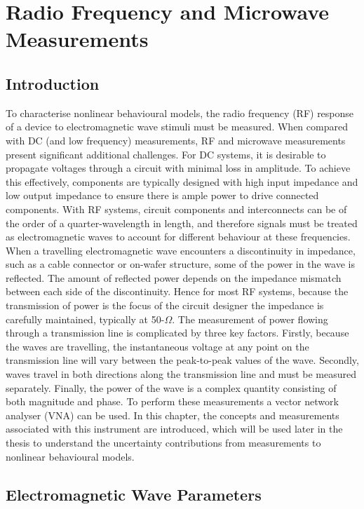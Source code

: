 \documentclass[../thesis/thesis.tex]{subfiles}
\begin{document}
\setcounter{chapter}{1}
\chapter{Radio Frequency and Microwave Measurements}
\section{Introduction}

To characterise nonlinear behavioural models, the radio frequency (RF) response of a device to electromagnetic wave stimuli must be measured. When compared with DC (and low frequency) measurements, RF and microwave measurements present significant additional challenges. 
For DC systems, it is desirable to propagate voltages through a circuit with minimal loss in amplitude. To achieve this effectively, components are typically designed with high input impedance and low output impedance to ensure there is ample power to drive connected components. With RF systems, circuit components and interconnects can be of the order of a quarter-wavelength in length, and therefore signals must be treated as electromagnetic waves to account for different behaviour at these frequencies.
When a travelling electromagnetic wave encounters a discontinuity in impedance, such as a cable connector or on-wafer structure, some of the power in the wave is reflected. The amount of reflected power depends on the impedance mismatch between each side of the discontinuity. Hence for most RF systems, because the transmission of power is the focus of the circuit designer the impedance is carefully maintained, typically at 50-$\Omega$. The measurement of power flowing through a transmission line is complicated by three key factors. Firstly, because the waves are travelling, the instantaneous voltage at any point on the transmission line will vary between the peak-to-peak values of the wave. Secondly, waves travel in both directions along the transmission line and must be measured separately. Finally, the power of the wave is a complex quantity consisting of both magnitude and phase.
To perform these measurements a vector network analyser (VNA) can be used. In this chapter, the concepts and measurements associated with this instrument are introduced, which will be used later in the thesis to understand the uncertainty contributions from measurements to nonlinear behavioural models.

\section{Electromagnetic Wave Parameters}
\end{document}
